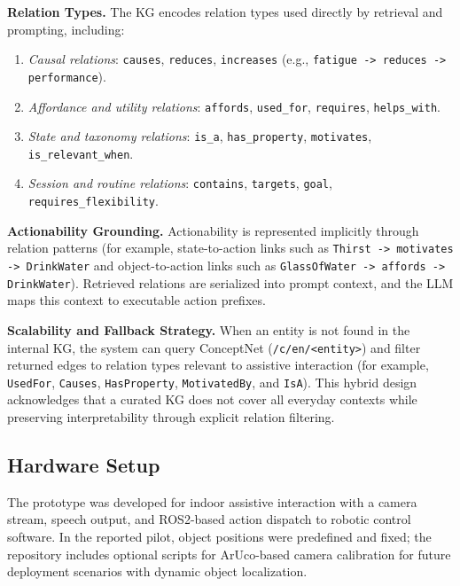 \documentclass[pdflatex,sn-basic,Numbered,iicol,twocolumn]{sn-jnl}%
\begin{document}
\textbf{Relation Types.} The KG encodes relation types used directly by retrieval and prompting, including:

\begin{enumerate}
\item \textit{Causal relations}: \texttt{causes}, \texttt{reduces}, \texttt{increases} (e.g., \texttt{fatigue -> reduces -> performance}).
\item \textit{Affordance and utility relations}: \texttt{affords}, \texttt{used\_for}, \texttt{requires}, \texttt{helps\_with}.
\item \textit{State and taxonomy relations}: \texttt{is\_a}, \texttt{has\_property}, \texttt{motivates}, \texttt{is\_relevant\_when}.
\item \textit{Session and routine relations}: \texttt{contains}, \texttt{targets}, \texttt{goal}, \texttt{requires\_flexibility}.
\end{enumerate}

\textbf{Actionability Grounding.} Actionability is represented implicitly through relation patterns (for example, state-to-action links such as \texttt{Thirst -> motivates -> DrinkWater} and object-to-action links such as \texttt{GlassOfWater -> affords -> DrinkWater}). Retrieved relations are serialized into prompt context, and the LLM maps this context to executable action prefixes.

\textbf{Scalability and Fallback Strategy.} When an entity is not found in the internal KG, the system can query ConceptNet (\texttt{/c/en/<entity>}) and filter returned edges to relation types relevant to assistive interaction (for example, \texttt{UsedFor}, \texttt{Causes}, \texttt{HasProperty}, \texttt{MotivatedBy}, and \texttt{IsA}). This hybrid design acknowledges that a curated KG does not cover all everyday contexts while preserving interpretability through explicit relation filtering.

\subsection{Hardware Setup}

The prototype was developed for indoor assistive interaction with a camera stream, speech output, and ROS2-based action dispatch to robotic control software. In the reported pilot, object positions were predefined and fixed; the repository includes optional scripts for ArUco-based camera calibration for future deployment scenarios with dynamic object localization.
\end{document}
